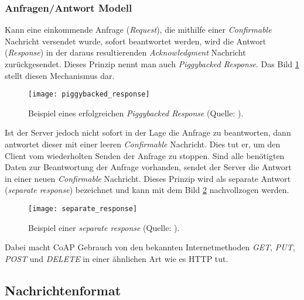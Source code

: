 \subsubsection{Anfragen/Antwort Modell}
\label{subsubsec:anfragen-antwort-modell}

Kann eine einkommende Anfrage (\textit{Request}), die mithilfe einer \textit{Confirmable} Nachricht versendet wurde, sofort beantwortet werden, wird die Antwort (\textit{Response}) in der daraus resultierenden \textit{Acknowledgment} Nachricht zurückgesendet. Dieses Prinzip nennt man auch \textit{Piggybacked Response}. Das Bild \ref{fig:beispiel-eines-erfolgreichen-piggybacked-response} stellt diesen Mechanismus dar.

\begin{figure}[h]
    \centering
    \texttt{[image: piggybacked\_response]}
    \caption{Beispiel eines erfolgreichen \textit{Piggybacked Response} (Quelle: \autocite{RFC7252}).}
    \label{fig:beispiel-eines-erfolgreichen-piggybacked-response}
\end{figure}

Ist der Server jedoch nicht sofort in der Lage die Anfrage zu beantworten, dann antwortet dieser mit einer leeren \textit{Confirmable} Nachricht. Dies tut er, um den Client vom wiederholten Senden der Anfrage zu stoppen. Sind alle benötigten Daten zur Beantwortung der Anfrage vorhanden, sendet der Server die Antwort in einer neuen \textit{Confirmable} Nachricht. Dieses Prinzip wird als separate Antwort (\textit{separate response}) bezeichnet und kann mit dem Bild \ref{fig:beispiel-einer-separate-response} nachvollzogen werden.

\begin{figure}[h]
    \centering
    \texttt{[image: separate\_response]}
    \caption{Beispiel einer \textit{separate response} (Quelle: \autocite{RFC7252}).}
    \label{fig:beispiel-einer-separate-response}
\end{figure}

Dabei macht CoAP Gebrauch von den bekannten Internetmethoden \textit{GET}, \textit{PUT}, \textit{POST} und \textit{DELETE} in einer ähnlichen Art wie es HTTP tut.

\subsection{Nachrichtenformat}
\label{subsec:nachrichtenformat}

